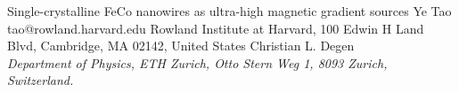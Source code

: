 \begin{conf-abstract}[]
{Single-crystalline FeCo nanowires as ultra-high magnetic gradient sources}
{\color{blue} Ye Tao}
{tao@rowland.harvard.edu}
{Rowland Institute at Harvard, 100 Edwin H Land Blvd, Cambridge, MA 02142, United States}
{{\color{blue}Christian L. Degen}\\ \textit{Department of Physics, ETH Zurich, Otto Stern Weg 1, 8093 Zurich, Switzerland.}\\ 
\decofourleft \decofourright}





\printbibliography[heading=none]

\end{conf-abstract}
